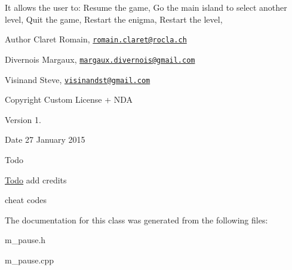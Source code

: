 It allows the user to\+: Resume the game, Go the main island to select another level, Quit the game, Restart the enigma, Restart the level, \begin{DoxyAuthor}{Author}
Claret Romain, \href{mailto:romain.claret@rocla.ch}{\tt romain.\+claret@rocla.\+ch} 

Divernois Margaux, \href{mailto:margaux.divernois@gmail.com}{\tt margaux.\+divernois@gmail.\+com} 

Visinand Steve, \href{mailto:visinandst@gmail.com}{\tt visinandst@gmail.\+com} 
\end{DoxyAuthor}
\begin{DoxyCopyright}{Copyright}
Custom License + N\+D\+A 
\end{DoxyCopyright}
\begin{DoxyVersion}{Version}
1. 
\end{DoxyVersion}
\begin{DoxyDate}{Date}
27 January 2015 
\end{DoxyDate}
\begin{DoxyRefDesc}{Todo}
\item[\hyperlink{todo__todo000014}{Todo}]add credits 

cheat codes \end{DoxyRefDesc}


The documentation for this class was generated from the following files\+:\begin{DoxyCompactItemize}
\item 
m\+\_\+pause.\+h\item 
m\+\_\+pause.\+cpp\end{DoxyCompactItemize}

